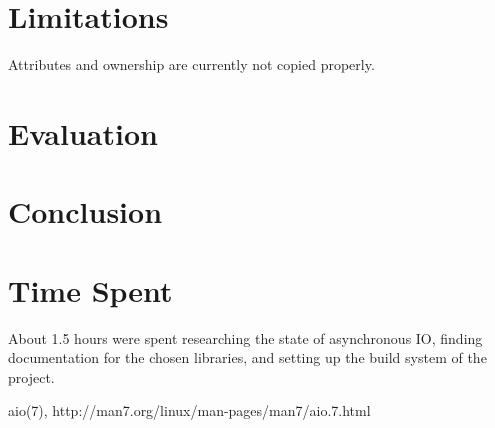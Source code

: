 \documentclass[11pt]{article}
\begin{document}
\section{Limitations}
Attributes and ownership are currently not copied properly.

\section{Evaluation}

\section{Conclusion}

\section{Time Spent}
About 1.5 hours were spent researching the state of asynchronous IO, finding documentation for the chosen libraries, and setting up the build system of the project.

\begin{thebibliography}{99}
	aio(7), http://man7.org/linux/man-pages/man7/aio.7.html
\end{thebibliography}
\end{document}
